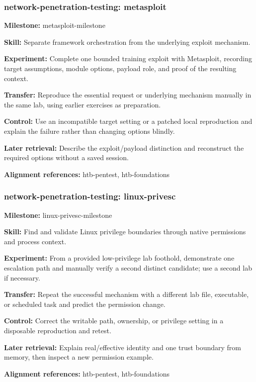\subsubsection{network-penetration-testing: metasploit}
\noindent\textbf{Milestone:} metasploit-milestone\par
\noindent\textbf{Skill:} Separate framework orchestration from the underlying exploit mechanism.\par
\noindent\textbf{Experiment:} Complete one bounded training exploit with Metasploit, recording target assumptions, module options, payload role, and proof of the resulting context.\par
\noindent\textbf{Transfer:} Reproduce the essential request or underlying mechanism manually in the same lab, using earlier exercises as preparation.\par
\noindent\textbf{Control:} Use an incompatible target setting or a patched local reproduction and explain the failure rather than changing options blindly.\par
\noindent\textbf{Later retrieval:} Describe the exploit/payload distinction and reconstruct the required options without a saved session.\par
\noindent\textbf{Alignment references:} htb-pentest, htb-foundations\par
\subsubsection{network-penetration-testing: linux-privesc}
\noindent\textbf{Milestone:} linux-privesc-milestone\par
\noindent\textbf{Skill:} Find and validate Linux privilege boundaries through native permissions and process context.\par
\noindent\textbf{Experiment:} From a provided low-privilege lab foothold, demonstrate one escalation path and manually verify a second distinct candidate; use a second lab if necessary.\par
\noindent\textbf{Transfer:} Repeat the successful mechanism with a different lab file, executable, or scheduled task and predict the permission change.\par
\noindent\textbf{Control:} Correct the writable path, ownership, or privilege setting in a disposable reproduction and retest.\par
\noindent\textbf{Later retrieval:} Explain real/effective identity and one trust boundary from memory, then inspect a new permission example.\par
\noindent\textbf{Alignment references:} htb-pentest, htb-foundations\par

